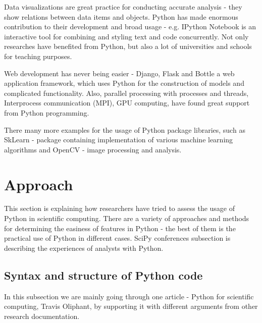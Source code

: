 Data visualizations are great practice for conducting accurate analysis - they show relations between data items and objects. Python has made enormous contribution to their development and broad usage - e.g. IPython Notebook is an interactive tool for combining and styling text and code concurrently. Not only researches have benefited from Python, but also a lot of universities and schools for teaching purposes.

Web development has never being easier - Django, Flask and Bottle a web application framework, which uses Python for the construction of models and complicated functionality. Also, parallel processing with processes and threads, Interprocess communication (MPI), GPU computing, have found great support from Python programming.

There many more examples for the usage of Python package libraries, such as SkLearn - package containing implementation of various machine learning algorithms and OpenCV - image processing and analysis. 

\section{Approach}
\label{approach}
This section is explaining how researchers have tried to assess the usage of Python in scientific computing. There are a variety of approaches and methods for determining the easiness of features in Python - the best of them is the practical use of Python in different cases. SciPy conferences subsection is describing the experiences of analysts with Python. 

\subsection{Syntax and structure of Python code} 
\label{syntax}

In this subsection we are mainly going through one article - Python for scientific computing, Travis Oliphant, by supporting it with different arguments from other research documentation. \cite{oliphant2007python}

